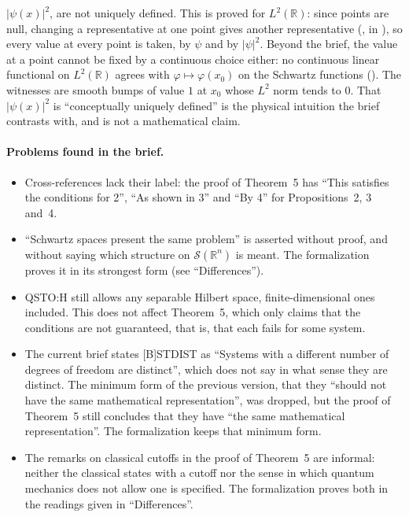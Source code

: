 \documentclass[11pt]{article}
\begin{document}
\begin{itemize}
  $|\psi(x)|^2$, are not uniquely defined. This is proved for $L^2(\mathbb{R})$: since points
  are null, changing a representative at one point gives another representative
  (, in ), so every value at every point is
  taken, by $\psi$ and by $|\psi|^2$. Beyond the brief, the value at a point cannot be fixed
  by a continuous choice either: no continuous linear functional on $L^2(\mathbb{R})$ agrees
  with $\varphi \mapsto \varphi(x_0)$ on the Schwartz functions
  (). The witnesses are smooth bumps of value $1$ at $x_0$
  whose $L^2$ norm tends to $0$. That $|\psi(x)|^2$ is ``conceptually uniquely defined'' is the
  physical intuition the brief contrasts with, and is not a mathematical claim.
\end{itemize}

\paragraph{Problems found in the brief.}
\begin{itemize}
\item Cross-references lack their label: the proof of Theorem~5 has ``This satisfies the
  conditions for 2'', ``As shown in 3'' and ``By 4'' for Propositions~2, 3 and~4.
\item ``Schwartz spaces present the same problem'' is asserted without proof, and without
  saying which structure on $\mathcal{S}(\mathbb{R}^n)$ is meant. The formalization proves it
  in its strongest form (see ``Differences'').
\item QSTO:H still allows any separable Hilbert space, finite-dimensional ones included. This
  does not affect Theorem~5, which only claims that the conditions are not guaranteed, that is,
  that each fails for some system.
\item The current brief states [B]STDIST as ``Systems with a different number of degrees of
  freedom are distinct'', which does not say in what sense they are distinct. The minimum form
  of the previous version, that they ``should not have the same mathematical
  representation'', was dropped, but the proof of Theorem~5 still concludes that they have
  ``the same mathematical representation''. The formalization keeps that minimum form.
\item The remarks on classical cutoffs in the proof of Theorem~5 are informal: neither the
  classical states with a cutoff nor the sense in which quantum mechanics does not allow one
  is specified. The formalization proves both in the readings given in
  ``Differences''.
\end{itemize}
\end{document}
